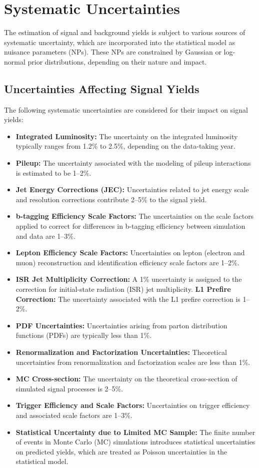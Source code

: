 \section{Systematic Uncertainties}

The estimation of signal and background yields is subject to various sources of systematic uncertainty, which are incorporated into the statistical model as nuisance parameters (NPs). These NPs are constrained by Gaussian or log-normal prior distributions, depending on their nature and impact.

\subsection{Uncertainties Affecting Signal Yields}
The following systematic uncertainties are considered for their impact on signal yields:
\begin{itemize}
    \item \textbf{Integrated Luminosity:} The uncertainty on the integrated luminosity typically ranges from 1.2\% to 2.5\%, depending on the data-taking year.
    \item \textbf{Pileup:} The uncertainty associated with the modeling of pileup interactions is estimated to be 1--2\%.
    \item \textbf{Jet Energy Corrections (JEC):} Uncertainties related to jet energy scale and resolution corrections contribute 2--5\% to the signal yield.
    \item \textbf{b-tagging Efficiency Scale Factors:} The uncertainties on the scale factors applied to correct for differences in b-tagging efficiency between simulation and data are 1--3\%.
    \item \textbf{Lepton Efficiency Scale Factors:} Uncertainties on lepton (electron and muon) reconstruction and identification efficiency scale factors are 1--2\%.
    \item \textbf{ISR Jet Multiplicity Correction:} A 1\% uncertainty is assigned to the correction for initial-state radiation (ISR) jet multiplicity.
    \textbf{L1 Prefire Correction:} The uncertainty associated with the L1 prefire correction is 1--2\%.
    \item \textbf{PDF Uncertainties:} Uncertainties arising from parton distribution functions (PDFs) are typically less than 1\%.
    \item \textbf{Renormalization and Factorization Uncertainties:} Theoretical uncertainties from renormalization and factorization scales are less than 1\%.
    \item \textbf{MC Cross-section:} The uncertainty on the theoretical cross-section of simulated signal processes is 2--5\%.
    \item \textbf{Trigger Efficiency and Scale Factors:} Uncertainties on trigger efficiency and associated scale factors are 1--3\%.
    \item \textbf{Statistical Uncertainty due to Limited MC Sample:} The finite number of events in Monte Carlo (MC) simulations introduces statistical uncertainties on predicted yields, which are treated as Poisson uncertainties in the statistical model.
\end{itemize}


